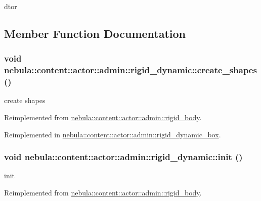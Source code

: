 dtor 

\subsection{Member Function Documentation}
\hypertarget{classnebula_1_1content_1_1actor_1_1admin_1_1rigid__dynamic_a263f07931e9281ea4044c522b567dde1}{
\subsubsection[{create\_\-shapes}]{\setlength{\rightskip}{0pt plus 5cm}void nebula::content::actor::admin::rigid\_\-dynamic::create\_\-shapes ()}}
\label{classnebula_1_1content_1_1actor_1_1admin_1_1rigid__dynamic_a263f07931e9281ea4044c522b567dde1}


create shapes 

Reimplemented from \hyperlink{classnebula_1_1content_1_1actor_1_1admin_1_1rigid__body_a649883f2e1d157c2b94cc475f458a3c4}{nebula::content::actor::admin::rigid\_\-body}.

Reimplemented in \hyperlink{classnebula_1_1content_1_1actor_1_1admin_1_1rigid__dynamic__box_ad0aba702fbf1cb38fabc3b84f6a2ef93}{nebula::content::actor::admin::rigid\_\-dynamic\_\-box}.\hypertarget{classnebula_1_1content_1_1actor_1_1admin_1_1rigid__dynamic_af30bd690cfa2d1a98b1458c658dc97d6}{
\subsubsection[{init}]{\setlength{\rightskip}{0pt plus 5cm}void nebula::content::actor::admin::rigid\_\-dynamic::init ()}}
\label{classnebula_1_1content_1_1actor_1_1admin_1_1rigid__dynamic_af30bd690cfa2d1a98b1458c658dc97d6}


init 

Reimplemented from \hyperlink{classnebula_1_1content_1_1actor_1_1admin_1_1rigid__body_a549b82effcb63341aa4057712446ce22}{nebula::content::actor::admin::rigid\_\-body}.

